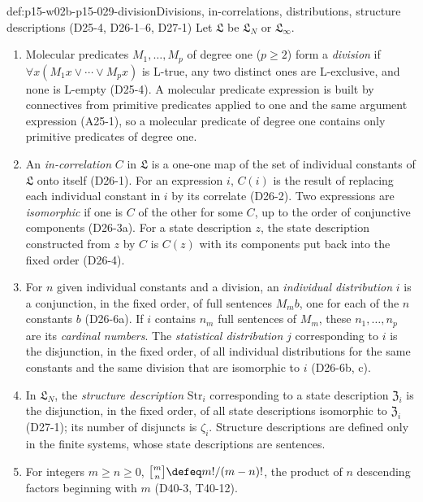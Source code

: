 \begin{hbdefinition}{def:p15-w02b-p15-029-division}{Divisions, in-correlations, distributions, structure descriptions (D25-4, D26-1--6, D27-1)}
Let \(\mathfrak L\) be \(\mathfrak L_N\) or \(\mathfrak L_\infty\).
\begin{enumerate}
 \item Molecular predicates \(M_1,\ldots,M_p\) of degree one
       (\(p\geq2\)) form a \emph{division} if
       \(\forall x(M_1x\lor\cdots\lor M_px)\) is L-true, any two distinct
       ones are L-exclusive, and none is L-empty (D25-4). A molecular
       predicate expression is built by connectives from primitive
       predicates applied to one and the same argument expression
       (A25-1), so a molecular predicate of degree one contains only
       primitive predicates of degree one.
 \item An \emph{in-correlation} \(C\) in \(\mathfrak L\) is a one-one
       map of the set of individual constants of \(\mathfrak L\) onto
       itself (D26-1). For an expression \(i\), \(C(i)\) is the result
       of replacing each individual constant in \(i\) by its correlate
       (D26-2). Two expressions are \emph{isomorphic} if one is
       \(C\) of the other for some \(C\), up to the order of conjunctive
       components (D26-3a). For a state description \(z\), the state
       description constructed from \(z\) by \(C\) is \(C(z)\) with
       its components put back into the fixed order (D26-4).
 \item For \(n\) given individual constants and a division, an
       \emph{individual distribution} \(i\) is a conjunction, in the
       fixed order, of full sentences \(M_m b\), one for each of the
       \(n\) constants \(b\) (D26-6a). If \(i\) contains \(n_m\) full
       sentences of \(M_m\), these \(n_1,\ldots,n_p\) are its
       \emph{cardinal numbers}. The \emph{statistical distribution}
       \(j\) corresponding to \(i\) is the disjunction, in the fixed
       order, of all individual distributions for the same constants and
       the same division that are isomorphic to \(i\) (D26-6b, c).
 \item In \(\mathfrak L_N\), the \emph{structure description}
       \(\mathrm{Str}_i\) corresponding to a state description
       \(\mathfrak Z_i\) is the disjunction, in the fixed order, of all
       state descriptions isomorphic to \(\mathfrak Z_i\) (D27-1); its
       number of disjuncts is \(\zeta_i\). Structure descriptions are
       defined only in the finite systems, whose state descriptions are
       sentences.
 \item For integers \(m\geq n\geq0\),
       \(\genfrac{[}{]}{0pt}{}{m}{n}\defeq m!/(m-n)!\), the product of
       \(n\) descending factors beginning with \(m\) (D40-3, T40-12).
\end{enumerate}
\end{hbdefinition}

